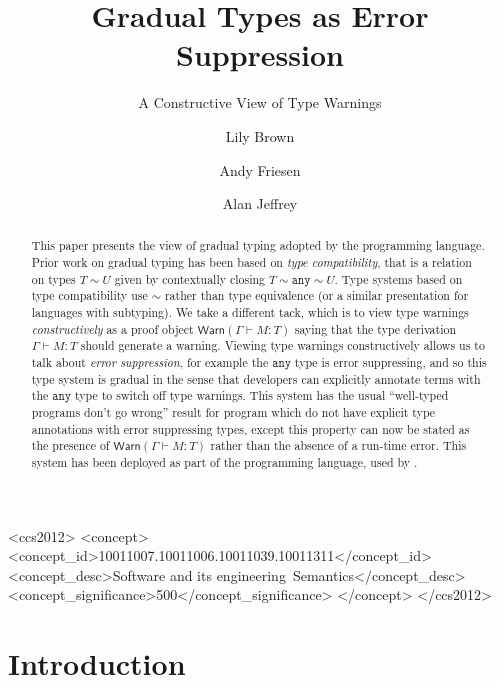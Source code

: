 \documentclass[acmsmall,review,screen]{acmart}
\newcommand{\ANY}{\mathtt{any}}
\newcommand{\WARN}{\mathsf{Warn}}
\newcommand{\compat}{\sim}
\begin{document}
\title{Gradual Types as Error Suppression}
\subtitle{A Constructive View of Type Warnings}

\author{Lily Brown}
\author{Andy Friesen}
\author{Alan Jeffrey}

\begin{abstract}
  This paper presents the view of gradual typing adopted by the
   programming language. Prior work on gradual typing has
  been based on \emph{type compatibility}, that is a relation on types
  $T \compat U$ given by contextually closing $T \compat \ANY \compat
  U$.  Type systems based on type compatibility use $\compat$ rather
  than type equivalence (or a similar presentation for languages with
  subtyping). We take a different tack, which is to view type warnings
  \emph{constructively} as a proof object $\WARN(\Gamma \vdash M : T)$
  saying that the type derivation $\Gamma \vdash M : T$ should
  generate a warning. Viewing type warnings constructively allows us
  to talk about \emph{error suppression}, for example the $\ANY$ type
  is error suppressing, and so this type system is gradual in the
  sense that developers can explicitly annotate terms with the $\ANY$
  type to switch off type warnings. This system has the usual ``well-typed
  programs don't go wrong'' result for program which do not have
  explicit type annotations with error suppressing types, except this
  property can now be stated as the presence of $\WARN(\Gamma \vdash M
  : T)$ rather than the absence of a run-time error. This system has
  been deployed as part of the  programming language, used
  by .
\end{abstract}

\begin{CCSXML}
<ccs2012>
<concept>
<concept_id>10011007.10011006.10011039.10011311</concept_id>
<concept_desc>Software and its engineering~Semantics</concept_desc>
<concept_significance>500</concept_significance>
</concept>
</ccs2012>
\end{CCSXML}

\maketitle

\section{Introduction}
\end{document}
